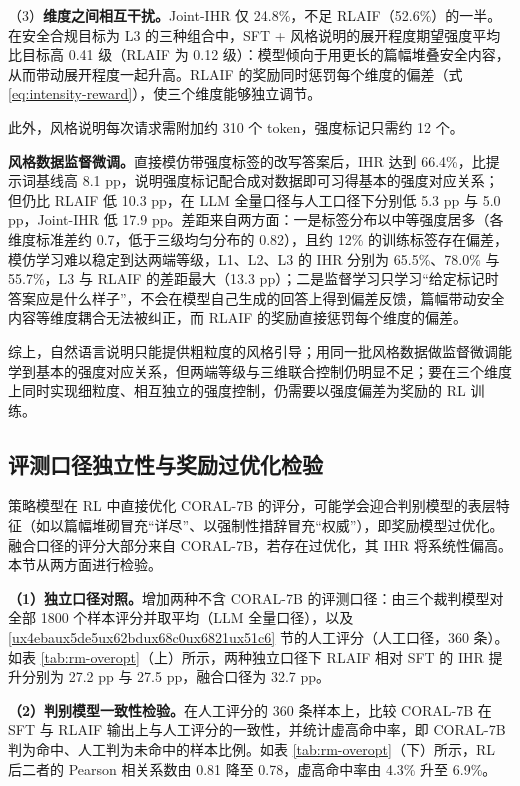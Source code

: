 \documentclass[fontset=fandol,type=master,campus=shenzhen,etitleauto=true]{hithesisbook}
\begin{document}
（3）\textbf{维度之间相互干扰。}Joint-IHR 仅 24.8\%，不足 RLAIF（52.6\%）的一半。在安全合规目标为 L3 的三种组合中，SFT + 风格说明的展开程度期望强度平均比目标高 0.41 级（RLAIF 为 0.12 级）：模型倾向于用更长的篇幅堆叠安全内容，从而带动展开程度一起升高。RLAIF 的奖励同时惩罚每个维度的偏差（式 \eqref{eq:intensity-reward}），使三个维度能够独立调节。

此外，风格说明每次请求需附加约 310 个 token，强度标记只需约 12 个。

\textbf{风格数据监督微调。}直接模仿带强度标签的改写答案后，IHR 达到 66.4\%，比提示词基线高 8.1 pp，说明强度标记配合成对数据即可习得基本的强度对应关系；但仍比 RLAIF 低 10.3 pp，在 LLM 全量口径与人工口径下分别低 5.3 pp 与 5.0 pp，Joint-IHR 低 17.9 pp。差距来自两方面：一是标签分布以中等强度居多（各维度标准差约 0.7，低于三级均匀分布的 0.82），且约 12\% 的训练标签存在偏差，模仿学习难以稳定到达两端等级，L1、L2、L3 的 IHR 分别为 65.5\%、78.0\% 与 55.7\%，L3 与 RLAIF 的差距最大（13.3 pp）；二是监督学习只学习“给定标记时答案应是什么样子”，不会在模型自己生成的回答上得到偏差反馈，篇幅带动安全内容等维度耦合无法被纠正，而 RLAIF 的奖励直接惩罚每个维度的偏差。

综上，自然语言说明只能提供粗粒度的风格引导；用同一批风格数据做监督微调能学到基本的强度对应关系，但两端等级与三维联合控制仍明显不足；要在三个维度上同时实现细粒度、相互独立的强度控制，仍需要以强度偏差为奖励的 RL 训练。

\subsection{评测口径独立性与奖励过优化检验}\label{subsec:rm-overopt}

策略模型在 RL 中直接优化 CORAL-7B 的评分，可能学会迎合判别模型的表层特征（如以篇幅堆砌冒充“详尽”、以强制性措辞冒充“权威”），即奖励模型过优化。融合口径的评分大部分来自 CORAL-7B，若存在过优化，其 IHR 将系统性偏高。本节从两方面进行检验。

\textbf{（1）独立口径对照。}增加两种不含 CORAL-7B 的评测口径：由三个裁判模型对全部 1800 个样本评分并取平均（LLM 全量口径），以及 \ref{ux4ebaux5de5ux62bdux68c0ux6821ux51c6} 节的人工评分（人工口径，360 条）。如表 \ref{tab:rm-overopt}（上）所示，两种独立口径下 RLAIF 相对 SFT 的 IHR 提升分别为 27.2 pp 与 27.5 pp，融合口径为 32.7 pp。

\textbf{（2）判别模型一致性检验。}在人工评分的 360 条样本上，比较 CORAL-7B 在 SFT 与 RLAIF 输出上与人工评分的一致性，并统计虚高命中率，即 CORAL-7B 判为命中、人工判为未命中的样本比例。如表 \ref{tab:rm-overopt}（下）所示，RL 后二者的 Pearson 相关系数由 0.81 降至 0.78，虚高命中率由 4.3\% 升至 6.9\%。
\end{document}
